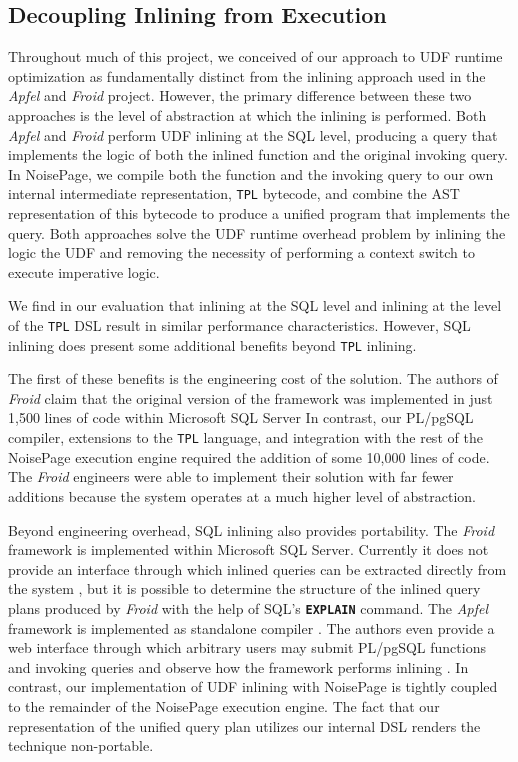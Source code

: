 \documentclass{vldb}
\newcommand{\dbSQL}[1]{\texttt{\textbf{#1}}\xspace}
\newcommand{\tpl}{\texttt{TPL}\xspace}
\newcommand{\plpgsql}{PL/pgSQL\xspace}
\begin{document}
\subsection{Decoupling Inlining from Execution}

Throughout much of this project, we conceived of our approach to UDF runtime optimization as fundamentally distinct from the inlining approach used in the \textit{Apfel} and \textit{Froid} project. However, the primary difference between these two approaches is the level of abstraction at which the inlining is performed. Both \textit{Apfel} and \textit{Froid} perform UDF inlining at the SQL level, producing a query that implements the logic of both the inlined function and the original invoking query. In NoisePage, we compile both the function and the invoking query to our own internal intermediate representation, \tpl bytecode, and combine the AST representation of this bytecode to produce a unified program that implements the query. Both approaches solve the UDF runtime overhead problem by inlining the logic the UDF and removing the necessity of performing a context switch to execute imperative logic.

We find in our evaluation that inlining at the SQL level and inlining at the level of the \tpl DSL result in similar performance characteristics. However, SQL inlining does present some additional benefits beyond \tpl inlining.

The first of these benefits is the engineering cost of the solution. The authors of \textit{Froid} claim that the original version of the framework was implemented in just 1,500 lines of code within Microsoft SQL Server \cite{froid} In contrast, our \plpgsql compiler, extensions to the \tpl language, and integration with the rest of the NoisePage execution engine required the addition of some 10,000 lines of code. The \textit{Froid} engineers were able to implement their solution with far fewer additions because the system operates at a much higher level of abstraction.

Beyond engineering overhead, SQL inlining also provides portability. The \textit{Froid} framework is implemented within Microsoft SQL Server. Currently it does not provide an interface through which inlined queries can be extracted directly from the system \cite{froid}, but it is possible to determine the structure of the inlined query plans produced by \textit{Froid} with the help of SQL's \dbSQL{EXPLAIN} command. The \textit{Apfel} framework is implemented as standalone compiler \cite{apfel}. The authors even provide a web interface through which arbitrary users may submit \plpgsql functions and invoking queries and observe how the framework performs inlining \cite{apfelweb}. In contrast, our implementation of UDF inlining with NoisePage is tightly coupled to the remainder of the NoisePage execution engine. The fact that our representation of the unified query plan utilizes our internal DSL renders the technique non-portable.
\end{document}
